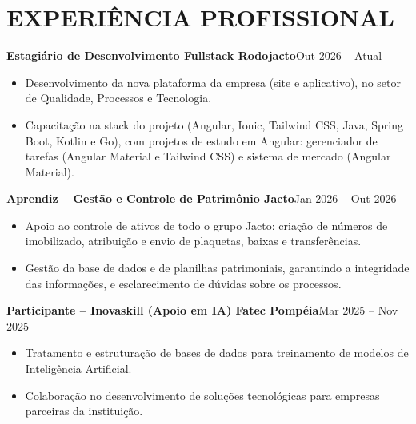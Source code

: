 \documentclass[9pt,a4paper]{extarticle}
\newcommand{\entry}[2]{\vspace{2pt}\noindent\textbf{#1}\hfill{\color{gray}#2}\par}
\begin{document}
\section*{EXPERIÊNCIA PROFISSIONAL}
\entry{Estagiário de Desenvolvimento Fullstack \textperiodcentered{} Rodojacto}{Out 2026 – Atual}
\begin{itemize}
  \item Desenvolvimento da nova plataforma da empresa (site e aplicativo), no setor de Qualidade, Processos e Tecnologia.
  \item Capacitação na stack do projeto (Angular, Ionic, Tailwind CSS, Java, Spring Boot, Kotlin e Go), com projetos de estudo em Angular: gerenciador de tarefas (Angular Material e Tailwind CSS) e sistema de mercado (Angular Material).
\end{itemize}
\entry{Aprendiz – Gestão e Controle de Patrimônio \textperiodcentered{} Jacto}{Jan 2026 – Out 2026}
\begin{itemize}
  \item Apoio ao controle de ativos de todo o grupo Jacto: criação de números de imobilizado, atribuição e envio de plaquetas, baixas e transferências.
  \item Gestão da base de dados e de planilhas patrimoniais, garantindo a integridade das informações, e esclarecimento de dúvidas sobre os processos.
\end{itemize}
\entry{Participante – Inovaskill (Apoio em IA) \textperiodcentered{} Fatec Pompéia}{Mar 2025 – Nov 2025}
\begin{itemize}
  \item Tratamento e estruturação de bases de dados para treinamento de modelos de Inteligência Artificial.
  \item Colaboração no desenvolvimento de soluções tecnológicas para empresas parceiras da instituição.
\end{itemize}
\end{document}
